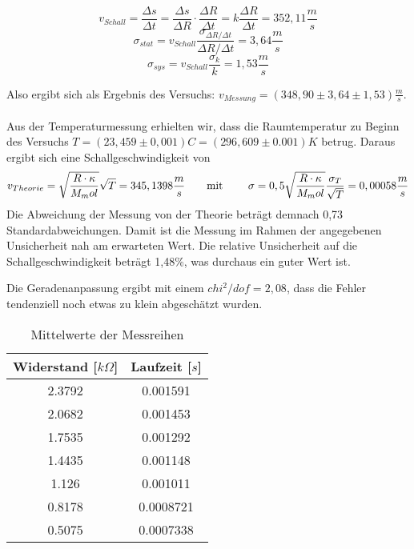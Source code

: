 \documentclass[a4paper]{article}
\begin{document}
	\begin{equation}
	v_{Schall} = \frac{\Delta s}{\Delta t} = \frac{\Delta s}{\Delta R} \cdot \frac{\Delta R}{\Delta t} = k \frac{\Delta R}{\Delta t} = 352,11 \frac{m}{s}
	\end{equation}
	\begin{equation}
	\sigma_{stat} = v_{Schall} \frac{\sigma _{\Delta R / \Delta t}}{\Delta R / \Delta t} = 3,64 \frac{m}{s}
	\end{equation}
	\begin{equation}
	\sigma_{sys} = v_{Schall} \frac{\sigma _k}{k} = 1,53 \frac{m}{s}
	\end{equation}
	
	Also ergibt sich als Ergebnis des Versuchs: $v_{Messung} = (348,90 \pm 3,64 \pm 1,53) \frac{m}{s}$. \\\\
	Aus der Temperaturmessung erhielten wir, dass die Raumtemperatur zu Beginn des Versuchs $T = (23,459 \pm 0,001)C = (296,609 \pm 0.001)K$ betrug.
	Daraus ergibt sich eine Schallgeschwindigkeit von
	\begin{equation}
	v_{Theorie} =\sqrt{\frac{R\cdot\kappa}{M_mol}}\sqrt{T} = 345,1398 \frac{m}{s} \text{\qquad mit \qquad}
	\sigma = 0,5 \sqrt{\frac{R\cdot\kappa}{M_mol}} \frac{\sigma_T}{\sqrt{T}} = 0,00058 \frac{m}{s}
	\end{equation}
	Die Abweichung der Messung von der Theorie beträgt demnach 0,73 Standardabweichungen. Damit ist die Messung im Rahmen der angegebenen Unsicherheit nah am erwarteten Wert. Die relative Unsicherheit auf die Schallgeschwindigkeit beträgt 1,48\%, was durchaus ein guter Wert ist.
	
	Die Geradenanpassung ergibt mit einem $chi^2/dof = 2,08$, dass die Fehler tendenziell noch etwas zu klein abgeschätzt wurden.
	\begin{table}
		\begin{center}
			\begin{tabular}{|c|c|}
				\hline
				\textbf{Widerstand [$k\Omega$]} & \textbf{Laufzeit [$s$]} \\
				\hline
				2.3792 & 0.001591 \\
				\hline
				2.0682 & 0.001453 \\
				\hline
				1.7535 & 0.001292 \\
				\hline
				1.4435 & 0.001148 \\
				\hline
				1.126 & 0.001011 \\
				\hline
				0.8178 & 0.0008721 \\
				\hline
				0.5075 &  0.0007338 \\
				\hline
			\end{tabular}
		\end{center}
		\caption{Mittelwerte der Messreihen}
	\end{table}
	
\end{document}
